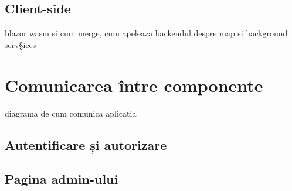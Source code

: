 \subsection{Client-side}
blazor wasm si cum merge, cum apeleaza backendul
despre map si background serv§ices
\section{Comunicarea între componente}
diagrama de cum comunica aplicatia
\subsection{Autentificare și autorizare}
\subsection{Pagina admin-ului}